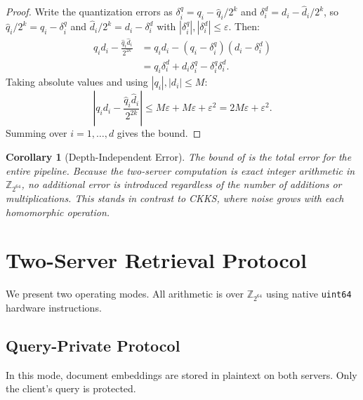 \documentclass[11pt]{article}
\newtheorem{corollary}[theorem]{Corollary}
\newcommand{\Z}{\mathbb{Z}}
\begin{document}
\begin{proof}
Write the quantization errors as $\delta_i^q = q_i - \hat{q}_i/2^k$ and $\delta_i^d = d_i - \hat{d}_i/2^k$, so $\hat{q}_i/2^k = q_i - \delta_i^q$ and $\hat{d}_i/2^k = d_i - \delta_i^d$ with $|\delta_i^q|, |\delta_i^d| \leq \varepsilon$. Then:
\begin{align*}
q_i d_i - \frac{\hat{q}_i \hat{d}_i}{2^{2k}} &= q_i d_i - (q_i - \delta_i^q)(d_i - \delta_i^d) \\
&= q_i \delta_i^d + d_i \delta_i^q - \delta_i^q \delta_i^d.
\end{align*}
Taking absolute values and using $|q_i|, |d_i| \leq M$:
\[
\left| q_i d_i - \frac{\hat{q}_i \hat{d}_i}{2^{2k}} \right| \leq M\varepsilon + M\varepsilon + \varepsilon^2 = 2M\varepsilon + \varepsilon^2.
\]
Summing over $i = 1, \ldots, d$ gives the bound. \qedhere
\end{proof}

\begin{corollary}[Depth-Independent Error]
\label{cor:depth-free}
The bound of  is the total error for the entire pipeline. Because the two-server computation is exact integer arithmetic in $\Z_{2^{64}}$, no additional error is introduced regardless of the number of additions or multiplications. This stands in contrast to CKKS, where noise grows with each homomorphic operation.
\end{corollary}


\section{Two-Server Retrieval Protocol}
\label{sec:protocol}

We present two operating modes. All arithmetic is over $\Z_{2^{64}}$ using native \texttt{uint64} hardware instructions.

\subsection{Query-Private Protocol}
\label{sec:query-private}

In this mode, document embeddings are stored in plaintext on both servers. Only the client's query is protected.
\end{document}
